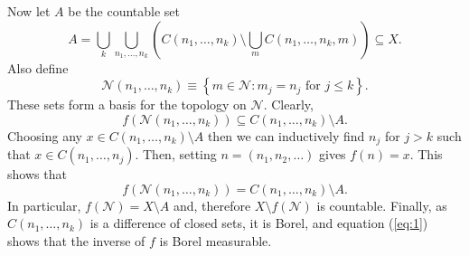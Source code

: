 \documentclass[12pt]{article}
\begin{document}
Now let $A$ be the countable set
\begin{equation*}
A = \bigcup_k\bigcup_{n_1,\ldots,n_k}\left( C(n_1,\ldots,n_k)\setminus\bigcup_mC(n_1,\ldots,n_k,m)\right)\subseteq X.
\end{equation*}
Also define
\begin{equation*}
\mathcal{N}(n_1,\ldots,n_k)\equiv\left\{m\in\mathcal{N}\colon m_j=n_j\text{ for }j\le k\right\}.
\end{equation*}
These sets form a basis for the topology on $\mathcal{N}$. Clearly,
\begin{equation*}
f\left(\mathcal{N}(n_1,\ldots,n_k)\right)\subseteq C(n_1,\ldots,n_k)\setminus A.
\end{equation*}
Choosing any $x\in C(n_1,\ldots,n_k)\setminus A$ then we can inductively find $n_j$ for $j>k$ such that $x\in C(n_1,\ldots,n_j)$. Then, setting $n=(n_1,n_2,\ldots)$ gives $f(n)=x$. This shows that
\begin{equation}\label{eq:1}
f\left(\mathcal{N}(n_1,\ldots,n_k)\right)=C(n_1,\ldots,n_k)\setminus A.
\end{equation}
In particular, $f(\mathcal{N})=X\setminus A$ and, therefore $X\setminus f(\mathcal{N})$ is countable.
Finally, as $C(n_1,\ldots,n_k)$ is a difference of closed sets, it is Borel, and equation (\ref{eq:1}) shows that the inverse of $f$ is Borel measurable.

\end{document}
